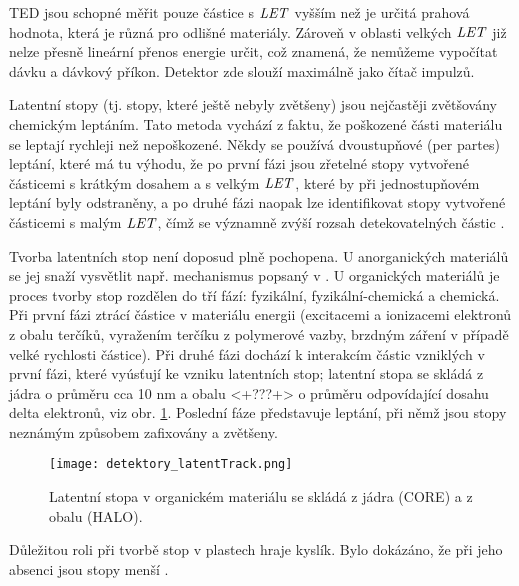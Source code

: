 TED jsou schopné měřit pouze částice s $\mathit{LET}$ vyšším než je určitá prahová hodnota, která je různá pro odlišné materiály. Zároveň v oblasti velkých $\mathit{LET}$ již nelze přesně lineární přenos energie určit, což znamená, že nemůžeme vypočítat dávku a dávkový příkon. Detektor zde slouží maximálně jako čítač impulzů. %

Latentní stopy (tj. stopy, které ještě nebyly zvětšeny) jsou nejčastěji zvětšovány chemickým leptáním. Tato metoda vychází z faktu, že poškozené části materiálu se leptají rychleji než nepoškozené. Někdy se používá dvoustupňové (per partes) leptání, které má tu výhodu, že po první fázi jsou zřetelné stopy vytvořené částicemi s krátkým dosahem a s velkým $\mathit{LET}$, které by při jednostupňovém leptání byly odstraněny, a po druhé fázi naopak lze identifikovat stopy vytvořené částicemi s malým $\mathit{LET}$, čímž se významně zvýší rozsah detekovatelných částic \cite{cesky}. 

Tvorba latentních stop není doposud plně pochopena. U anorganických materiálů se jej snaží vysvětlit např. mechanismus popsaný v \cite{spikeModel}. U organických materiálů je proces tvorby stop rozdělen do tří fází: fyzikální, fyzikální-chemická a chemická. Při první fázi ztrácí částice v materiálu energii (excitacemi a ionizacemi elektronů z obalu terčíků, vyražením terčíku z polymerové vazby, brzdným záření v případě velké rychlosti částice). Při druhé fázi dochází k interakcím částic vzniklých v první fázi, které vyúsťují ke vzniku latentních stop; latentní stopa se skládá z jádra o průměru cca 10 nm a obalu <+???+> o průměru odpovídající dosahu delta elektronů, viz obr. \ref{fig:detektory_latentTrack}. Poslední fáze představuje leptání, při němž jsou stopy neznámým způsobem zafixovány a zvětšeny.
\begin{figure}[h]
  \centering
  \texttt{[image: detektory\_latentTrack.png]}
  \caption{Latentní stopa v organickém materiálu se skládá z jádra (CORE) a z obalu (HALO). \cite{thesisKPBrabcova}}
  \label{fig:detektory_latentTrack}
\end{figure}

Důležitou roli při tvorbě stop v plastech hraje kyslík. Bylo dokázáno, že při jeho absenci jsou stopy menší \cite{kyslikTED}.  

